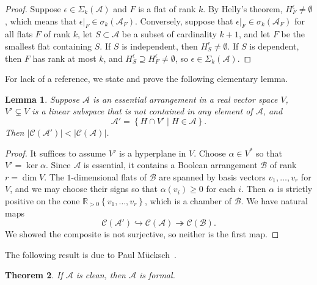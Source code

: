\documentclass[11pt]{article}
\newtheorem{theorem}{Theorem}[section]
\newtheorem{lemma}[theorem]{Lemma}
\theoremstyle{definition}
\renewcommand{\dim}{\operatorname{dim}}
\newcommand{\R}{{\mathbb{R}}}
\newcommand{\<}{\left<}
\renewcommand{\>}{\right>}
\newcommand{\A}{\mathcal{A}}
\newcommand{\cA}{\mathcal{A}}
\newcommand{\cB}{\mathcal{B}}
\newcommand{\cC}{\mathcal{C}}
\newcommand{\abs}[1]{\left|#1\right|}               %
\newcommand{\set}[1]{\left\{#1\right\}}             %
\begin{document}
\begin{proof}
Suppose $\epsilon\in\Sigma_k(\cA)$ and $F$ is a flat of rank $k$.  By Helly's
theorem, $H^\epsilon_F\neq\emptyset$, which means that $\epsilon|_F\in\sigma_k(\cA_F)$.
Conversely, suppose that $\epsilon|_F\in\sigma_k(\cA_F)$ for all flats $F$ of rank $k$,
let $S\subset\cA$ be a subset of cardinality $k+1$, and let $F$ be the smallest flat containing $S$.
If $S$ is independent, then $H^\epsilon_S\neq\emptyset$.  If $S$ is dependent, then $F$ has rank at most $k$,
and $H^\epsilon_S \supseteq H^\epsilon_F \neq \emptyset$, so $\epsilon\in \Sigma_k(\cA)$.
\end{proof}

For lack of a reference, we state and prove the following elementary lemma. 

\begin{lemma}\label{lem:chambers}
  Suppose $\cA$ is an essential arrangement in a real vector space $V$, $V'\subsetneq V$ is a linear subspace that is not contained in any element of $\cA$, and
  \[
  \cA'=\set{H\cap V'\mid H\in \cA}.
  \]
Then $\abs{\cC(\cA')}<\abs{\cC(\cA)}$.
\end{lemma}

\begin{proof}
  It suffices to assume $V'$ is a hyperplane in $V$.  Choose $\alpha\in V^*$
  so that $V'=\ker \alpha$.  Since $\cA$ is essential,
  it contains a Boolean arrangement $\cB$ of rank $r=\dim V$.  The $1$-dimensional flats of $\cB$ are spanned by basis vectors $v_1,\ldots,v_r$
  for $V$, and we may choose their signs so that $\alpha(v_i)\geq 0$ for each
  $i$.  Then $\alpha$ is strictly positive on the cone $\R_{>0}\set{v_1,\ldots,v_r}$, which is a chamber of $\cB$.
We have natural maps
\[
  \cC(\cA')\hookrightarrow \cC(\cA)\twoheadrightarrow
  \cC(\cB).
  \]
  We showed the composite is not surjective, so neither is the first map.
  \end{proof}


The following result is due to Paul M\"ucksch~\cite{Mue25}.
\begin{theorem}\label{thm:pm}
  If $\A$ is clean, then $\A$ is formal.
\end{theorem}
\end{document}
